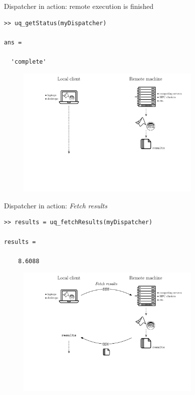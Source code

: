\documentclass[]{rsuqbeamernew}
\begin{document}
\begin{frame}[fragile]{Dispatcher in action: remote execution is finished}

\begin{lstlisting}[basicstyle=\scriptsize,numbers=none]
>> uq_getStatus(myDispatcher)
      
ans =
  
  'complete'
\end{lstlisting}
      
\begin{figure}[htbp]    
  \centering
  \includegraphics[width= 0.8\textwidth]{./figures/dispatch-and-fetch-completed.pdf}
\end{figure}
    
\end{frame}

\begin{frame}[fragile]{Dispatcher in action: \emph{Fetch results}}

\begin{lstlisting}[basicstyle=\scriptsize,numbers=none]
>> results = uq_fetchResults(myDispatcher)

results =

    8.6088
\end{lstlisting}
        
\begin{figure}[htbp]
  \centering
  \includegraphics[width= 0.8\textwidth]{./figures/dispatch-and-fetch-fetchResults.pdf}
\end{figure}
      
\end{frame}
\end{document}
